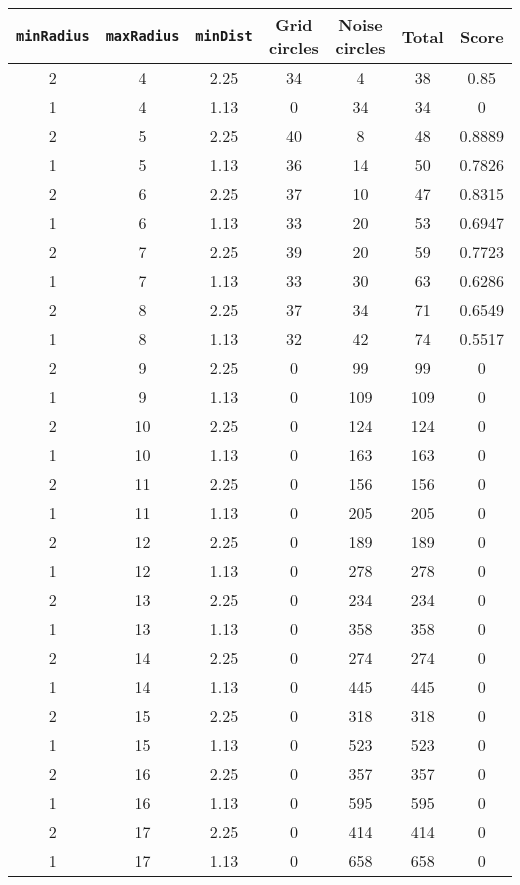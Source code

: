 \documentclass[letterpaper, 12pt]{article}
\begin{document}
\begin{longtable}{|c|c|c|c|c|c|c|}
\hline
\textbf{\texttt{minRadius}} & \textbf{\texttt{maxRadius}} & \textbf{\texttt{minDist}} & \textbf{Grid circles} & \textbf{Noise circles} & \textbf{Total} & \textbf{Score} \\
\hline
2 & 4 & 2.25 & 34 & 4 & 38 & 0.85 \\
\hline
1 & 4 & 1.13 & 0 & 34 & 34 & 0 \\
\hline
2 & 5 & 2.25 & 40 & 8 & 48 & 0.8889 \\
\hline
1 & 5 & 1.13 & 36 & 14 & 50 & 0.7826 \\
\hline
2 & 6 & 2.25 & 37 & 10 & 47 & 0.8315 \\
\hline
1 & 6 & 1.13 & 33 & 20 & 53 & 0.6947 \\
\hline
2 & 7 & 2.25 & 39 & 20 & 59 & 0.7723 \\
\hline
1 & 7 & 1.13 & 33 & 30 & 63 & 0.6286 \\
\hline
2 & 8 & 2.25 & 37 & 34 & 71 & 0.6549 \\
\hline
1 & 8 & 1.13 & 32 & 42 & 74 & 0.5517 \\
\hline
2 & 9 & 2.25 & 0 & 99 & 99 & 0 \\
\hline
1 & 9 & 1.13 & 0 & 109 & 109 & 0 \\
\hline
2 & 10 & 2.25 & 0 & 124 & 124 & 0 \\
\hline
1 & 10 & 1.13 & 0 & 163 & 163 & 0 \\
\hline
2 & 11 & 2.25 & 0 & 156 & 156 & 0 \\
\hline
1 & 11 & 1.13 & 0 & 205 & 205 & 0 \\
\hline
2 & 12 & 2.25 & 0 & 189 & 189 & 0 \\
\hline
1 & 12 & 1.13 & 0 & 278 & 278 & 0 \\
\hline
2 & 13 & 2.25 & 0 & 234 & 234 & 0 \\
\hline
1 & 13 & 1.13 & 0 & 358 & 358 & 0 \\
\hline
2 & 14 & 2.25 & 0 & 274 & 274 & 0 \\
\hline
1 & 14 & 1.13 & 0 & 445 & 445 & 0 \\
\hline
2 & 15 & 2.25 & 0 & 318 & 318 & 0 \\
\hline
1 & 15 & 1.13 & 0 & 523 & 523 & 0 \\
\hline
2 & 16 & 2.25 & 0 & 357 & 357 & 0 \\
\hline
1 & 16 & 1.13 & 0 & 595 & 595 & 0 \\
\hline
2 & 17 & 2.25 & 0 & 414 & 414 & 0 \\
\hline
1 & 17 & 1.13 & 0 & 658 & 658 & 0 \\

\end{longtable}
\end{document}
